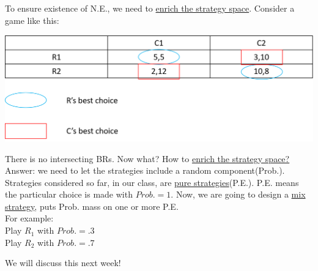 \documentclass[12pt]{article}
\newcommand{\uu}[1]{\underline{#1}}
\newcommand{\e}[1]{$ #1 $}
\begin{document}
\begin{spacing}{1.5}
            To ensure existence of N.E., we need to \uu{enrich the strategy space}.
            Consider a game like this:

            \begin{center}
                \includegraphics[scale = .5]{pic/lecture3/game_need_prob.png}
            \end{center}

            There is no intersecting BRs. Now what? How to \uu{enrich the strategy space?}\\
            Answer: we need to let the strategies include a random component(Prob.).
            Strategies considered so far, in our class, are \uu{pure strategies}(P.E.).
            P.E. means the particular choice is made with \e{Prob. = 1}. Now, we are going
            to design a \uu{mix strategy}, puts Prob. mass on one or more P.E.\\
            For example:\\
            Play \e{R_1} with \e{Prob. = .3}\\
            Play \e{R_2} with \e{Prob. = .7}

            We will discuss this next week!
            


            
            
\end{spacing}
\end{document}
